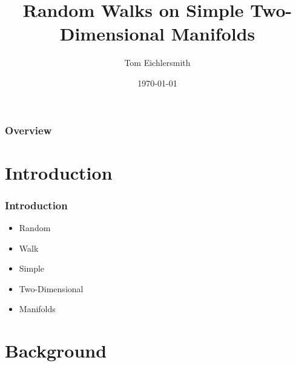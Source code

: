 \documentclass{beamer}
\title[Random Walks]{Random Walks on Simple Two-Dimensional Manifolds} %
\author{Tom Eichlersmith}
\institute[Hamline U]
{
Hamline University \\
\medskip
\texttt{teichlersmith01@hamline.edu}
}
\date{\today}
\begin{document}
\begin{frame}
	\titlepage %
\end{frame}

\begin{frame}
	\frametitle{Overview} %
	\tableofcontents %
\end{frame}


\section{Introduction} 

\begin{frame}

	\frametitle{Introduction}
	
	\begin{itemize}
		\item Random
		\item Walk
		\item Simple
		\item Two-Dimensional
		\item Manifolds
	\end{itemize}

\end{frame}

\section{Background}
\end{document}
